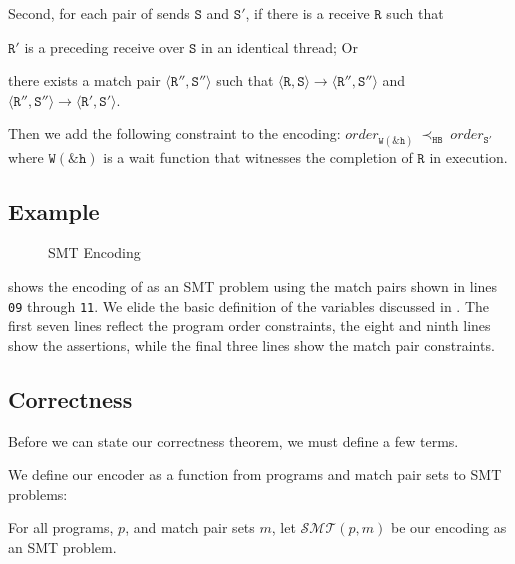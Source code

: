 Second, for each pair of sends $\mathtt{S}$ and $\mathtt{S'}$, if
there is a receive $\mathtt{R}$ such that

\begin{compactenum}
\item $\mathtt{R'}$ is a preceding receive over $\mathtt{S}$ in an
  identical thread; Or

\item there exists a match pair $\langle\mathtt{R''},
  \mathtt{S''}\rangle$ such that $\langle\mathtt{R}, \mathtt{S}\rangle
  \rightarrow \langle\mathtt{R''}, \mathtt{S''}\rangle$ and
  $\langle\mathtt{R''}, \mathtt{S''}\rangle \rightarrow
  \langle\mathtt{R'}, \mathtt{S'}\rangle$.
\end{compactenum}

Then we add the following constraint to the encoding:
$\mathit{order}_{\mathtt{W(\&h)}}\ \mathrm{\prec_{\mathtt{HB}}}\ \mathit{order}_{\mathtt{S'}}$
where $\mathtt{W(\&h)}$ is a wait function that witnesses the
completion of $\mathtt{R}$ in execution.

\subsection{Example}

\begin{figure}[t]
\begin{center}
\usebox{\boxSMTc}
\end{center}
\caption{SMT Encoding} \label{fig:smt-encode}
\end{figure}

 shows the encoding of  as an
SMT problem using the match pairs shown in lines \texttt{09} through
\texttt{11}. We elide the basic definition of the variables discussed
in . The first seven lines reflect the program
order constraints, the eight and ninth lines show the assertions,
while the final three lines show the match pair constraints.

\subsection{Correctness}

Before we can state our correctness theorem, we must define a few
terms.

We define our encoder as a function from programs and match pair sets
to SMT problems:

\begin{definition}[Encoder]
For all programs, $p$, and match pair sets $m$, let $\mathcal{SMT}(p,
m)$ be our encoding as an SMT problem.
\end{definition}

